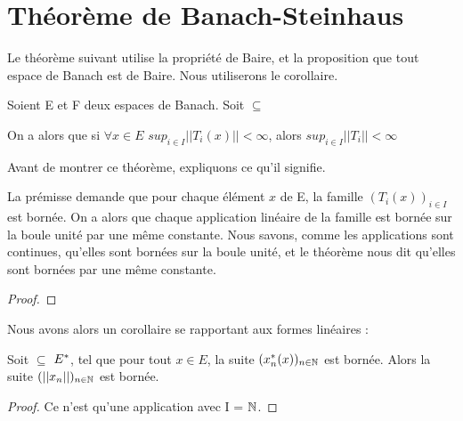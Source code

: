 \section{Théorème de Banach-Steinhaus}

Le théorème suivant utilise la propriété de Baire, et la proposition que tout
espace de Banach est de Baire. Nous utiliserons le corollaire.

\begin{theorem} 
	Soient E et F deux espaces de Banach.
	Soit  $\subseteq$ 
	\label{banach-steinhaus}

	On a alors que si $\forall x \in E$ $sup_{i \in I}||T_{i}(x)|| < \infty$,
	alors $sup_{i \in I} ||T_{i}|| < \infty$
\end{theorem}

Avant de montrer ce théorème, expliquons ce qu'il signifie.

La prémisse demande que pour chaque élément $x$ de E, la famille $(T_{i}(x))_{i
\in I}$ est bornée.
On a alors que chaque application linéaire de la famille est bornée sur la
boule unité par une même constante. Nous savons, comme les applications sont
continues, qu'elles sont bornées sur la boule unité, et le théorème nous dit
qu'elles sont bornées par une même constante.

\begin{proof}
	
\end{proof}

Nous avons alors un corollaire se rapportant aux formes linéaires :

\begin{corollary}
	Soit  $\subseteq$ $E^{*}$, tel que pour
	tout $x \in E$, la suite $(x_{n}^{*}(x))_{n \in \mathbb{N}}$ est bornée. Alors
	la suite $(||x_{n}||)_{n \in \mathbb{N}}$ est bornée.
\end{corollary}

\begin{proof}
	Ce n'est qu'une application avec I = $\mathbb{N}$.
\end{proof}
